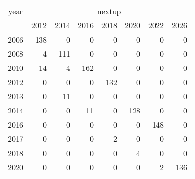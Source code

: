 \footnotesize\begin{tabular}[t]{lrrrrrrr}
\toprule
\multicolumn{1}{c}{year} & \multicolumn{7}{c}{nextup} \\
\cmidrule(l{3pt}r{3pt}){1-1} \cmidrule(l{3pt}r{3pt}){2-8}
  & 2012 & 2014 & 2016 & 2018 & 2020 & 2022 & 2026\\
\midrule
2006 & 138 & 0 & 0 & 0 & 0 & 0 & 0\\
2008 & 4 & 111 & 0 & 0 & 0 & 0 & 0\\
2010 & 14 & 4 & 162 & 0 & 0 & 0 & 0\\
2012 & 0 & 0 & 0 & 132 & 0 & 0 & 0\\
2013 & 0 & 11 & 0 & 0 & 0 & 0 & 0\\
2014 & 0 & 0 & 11 & 0 & 128 & 0 & 0\\
2016 & 0 & 0 & 0 & 0 & 0 & 148 & 0\\
2017 & 0 & 0 & 0 & 2 & 0 & 0 & 0\\
2018 & 0 & 0 & 0 & 0 & 4 & 0 & 0\\
2020 & 0 & 0 & 0 & 0 & 0 & 2 & 136\\
\bottomrule
\end{tabular}
